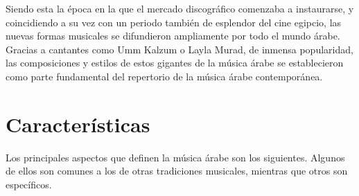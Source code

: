     Siendo esta la época en la que el mercado discográfico comenzaba a instaurarse, y coincidiendo a su vez con un periodo también de esplendor del cine egipcio, las nuevas formas musicales se difundieron ampliamente por todo el mundo árabe. Gracias a cantantes como Umm Kalzum o Layla Murad, de inmensa popularidad, las composiciones y estilos de estos gigantes de la música árabe se establecieron como parte fundamental del repertorio de la música árabe contemporánea.

    \section{Características}

    Los principales aspectos que definen la música árabe son los siguientes. Algunos de ellos son comunes a los de otras tradiciones musicales, mientras que otros son específicos.


